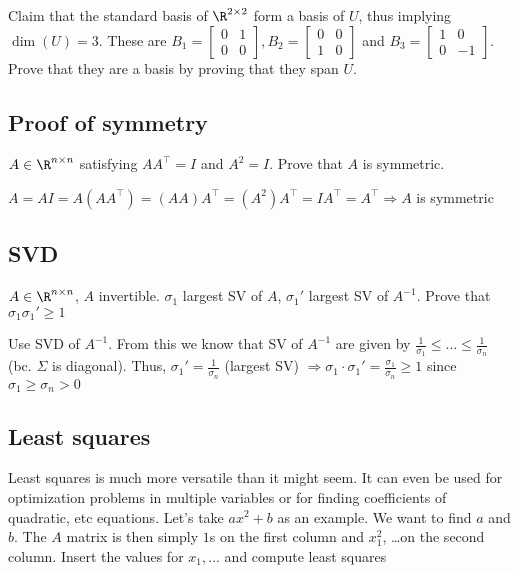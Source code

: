 Claim that the standard basis of $\R^{2 \times 2}$ form a basis of $U$, thus implying $\dim(U) = 3$. These are $B_1 = \begin{bmatrix}0 & 1\\0 & 0\end{bmatrix}, B_2 = \begin{bmatrix}0 & 0\\1 & 0\end{bmatrix}$ and $B_3 = \begin{bmatrix}1 & 0\\0 & -1\end{bmatrix}$. Prove that they are a basis by proving that they span $U$.


\newsection
\vspace{-0.5pc}
\subsection{Proof of symmetry}
\inlineex \hspace{0mm} $A \in \R^{n \times n}$ satisfying $AA^{\top} = I$ and $A^2 = I$. Prove that $A$ is symmetric.

$A = AI = A(AA^{\top}) = (AA)A^{\top}= (A^2)A^{\top} = IA^{\top} = A^{\top} \Rightarrow A$ is symmetric


\vspace{-0.5pc}
\newsectionNoPB
\subsection{SVD}
\inlineex \hspace{0mm} $A \in \R^{n \times n}$, $A$ invertible. $\sigma_1$ largest SV of $A$, $\sigma_1'$ largest SV of $A^{-1}$. Prove that $\sigma_1\sigma_1' \geq 1$

Use SVD of $A^{-1}$. From this we know that SV of $A^{-1}$ are given by $\frac{1}{\sigma_1} \leq \ldots \leq \frac{1}{\sigma_n}$ (bc. $\Sigma$ is diagonal). Thus, $\sigma_1' = \frac{1}{\sigma_n}$ (largest SV) $\Rightarrow \sigma_1 \cdot \sigma_1' = \frac{\sigma_1}{\sigma_n} \geq 1$ since $\sigma_1 \geq \sigma_n > 0$


\vspace{-0.5pc}
\newsectionNoPB
\subsection{Least squares}
Least squares is much more versatile than it might seem.
It can even be used for optimization problems in multiple variables or for finding coefficients of quadratic, etc equations. Let's take $ax^2 + b$ as an example. We want to find $a$ and $b$. The $A$ matrix is then simply $1$s on the first column and $x_1^2$, \dots on the second column. Insert the values for $x_1, \ldots$ and compute least squares

